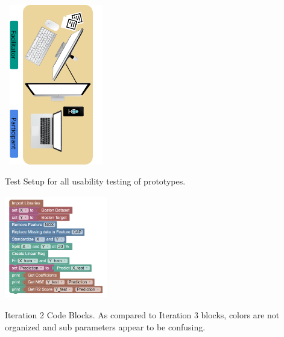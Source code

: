 \documentclass{sigchi-ext}
\begin{document}
\begin{marginfigure}[-0.5pc]
\begin{minipage}{\marginparwidth}
     \centering
    \includegraphics[width=4.5cm,height=7cm]{figures/setup.png}
    \caption{Test Setup for all usability testing of prototypes.}
    \label{fig:setup}
    \end{minipage}
\end{marginfigure}
\begin{marginfigure}[1.5pc]
\begin{minipage}{\marginparwidth}
     \centering
    \includegraphics[width=4.5cm,height=4.5cm]{figures/IT2.png}
    \caption{Iteration 2 Code Blocks. As compared to Iteration 3 blocks, colors are not organized and sub parameters appear to be confusing.}
    \label{fig:IT2_Blocks}
    \end{minipage}
\end{marginfigure}
\end{document}
